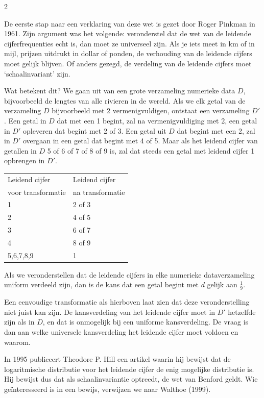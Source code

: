 \begin{multicols}{2}

De eerste stap naar een verklaring van deze wet is gezet door Roger Pinkman in 1961. Zijn argument was het volgende: veronderstel dat de wet van de leidende cijferfrequenties echt is, dan moet ze universeel zijn. Als je iets meet in km of in mijl, prijzen uitdrukt in dollar of ponden, de verhouding van de leidende cijfers moet gelijk blijven. Of anders gezegd, de verdeling van de leidende  cijfers moet `schaalinvariant' zijn.

Wat betekent dit?
We gaan uit van een grote verzameling numerieke data $D$, bijvoorbeeld de lengtes van alle rivieren in de wereld. Als we elk getal van de verzameling $D$ bijvoorbeeld met 2 vermenigvuldigen, ontstaat een verzameling $D'$. Een getal in $D$ dat met een 1 begint, zal na vermenigvuldiging met 2, een getal in $D'$ opleveren dat begint met 2 of 3. Een getal uit $D$ dat begint met een 2, zal in $D'$ overgaan in een getal dat begint met 4 of 5. Maar als het leidend cijfer van getallen in $D$  5 of 6 of 7 of 8 of 9 is, zal dat steeds een getal met leidend cijfer 1 opbrengen in $D'$.
\begin{center}
\begin{tabular}{ |l| l| }
\hline
  Leidend cijfer &Leidend cijfer \\
  voor transformatie&na transformatie\\ \hline
  1 &2 of 3 \\ \hline
  2 & 4 of 5 \\ \hline
 3 &6 of 7 \\ \hline
  4 & 8 of 9 \\ \hline
 5,6,7,8,9 &1\\ \hline
\end{tabular}
\end{center}

Als we veronderstellen dat de leidende cijfers in elke numerieke dataverzameling uniform verdeeld zijn, dan is de kans dat een getal begint met $d$ gelijk aan $\frac{1}{9}$.

Een eenvoudige transformatie als hierboven laat zien dat deze veronderstelling niet juist kan zijn. De kansverdeling van het leidende cijfer moet in $D'$ hetzelfde zijn als in $D$, en dat is onmogelijk bij een uniforme kansverdeling. 
De vraag is dan aan welke universele kansverdeling het leidende cijfer moet voldoen en waarom.

In 1995 publiceert Theodore P. Hill een artikel waarin hij bewijst dat de logaritmische distributie voor het leidende cijfer de enig mogelijke distributie is. Hij bewijst dus dat als schaalinvariantie optreedt, de wet van Benford geldt. Wie geïnteresseerd is in een bewijs, verwijzen we naar Walthoe (1999).     


\end{multicols}
